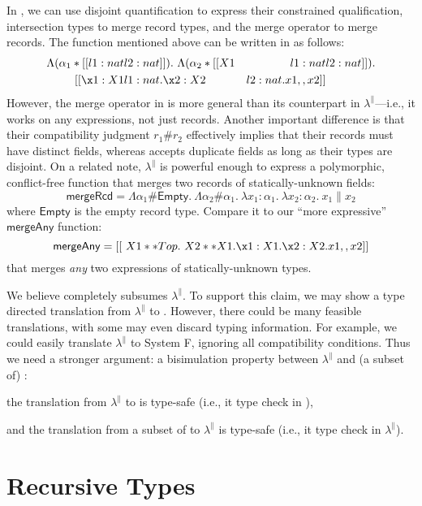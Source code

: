 In \fnamee, we can use disjoint quantification to express their constrained
qualification, intersection types to merge record types, and the merge operator
to merge records. The function mentioned above can be written in \fnamee as
follows:
\begin{align*}
  \Lambda (\alpha_1 * [[ {l1 : nat} & {l2 : nat} ]]) .\  \Lambda (\alpha_2 * [[  X1 & {l1 : nat} & {l2 : nat} ]]) . \\
  \qquad [[\x1 : X1 & {l1 : nat} . \x2 : X2 & {l2 : nat} . x1 ,, x2]]
\end{align*}
However, the merge operator in \fnamee is more general than its counterpart in
$\lambda^{\|}$---i.e., it works on any expressions, not just records. Another
important difference is that their compatibility judgment $r_1 \# r_2$
effectively implies that their records must have distinct fields, whereas
\fnamee accepts duplicate fields as long as their types are disjoint. On a
related note, $\lambda^{\|}$ is powerful enough to express a polymorphic,
conflict-free function that merges two records of statically-unknown fields:
\[
  \mathsf{mergeRcd} = \Lambda \alpha_1 \# \mathsf{Empty} .\ \Lambda \alpha_2 \# \alpha_1 .\ \lambda x_1 : \alpha_1 .\ \lambda x_2 : \alpha_2 .\ x_1 \| x_2
\]
where $\mathsf{Empty}$ is the empty record type. Compare it to our ``more expressive'' $\mathsf{mergeAny}$ function:
\[
  \mathsf{mergeAny} = [[\ X1 ** Top . \ X2 ** X1 . \x1 : X1 . \x2 : X2 . x1 ,, x2 ]]
\]
that merges \textit{any} two expressions of statically-unknown types.

We believe \fnamee completely subsumes $\lambda^{\|}$. To support this claim, we
may show a type directed translation from $\lambda^{\|}$ to \fnamee. However,
there could be many feasible translations, with some may even discard typing
information. For example, we could easily translate $\lambda^{\|}$ to System F,
ignoring all compatibility conditions. Thus we need a stronger argument: a
bisimulation property between $\lambda^{\|}$ and (a subset of) \fnamee:
\begin{inparaenum}[(1)]
\item the translation from $\lambda^{\|}$ to \fnamee is type-safe (i.e., it type check in \fnamee),
\item and the translation from a subset of \fnamee to $\lambda^{\|}$ is type-safe (i.e., it type check in $\lambda^{\|}$).
\end{inparaenum}


\section{Recursive Types}

